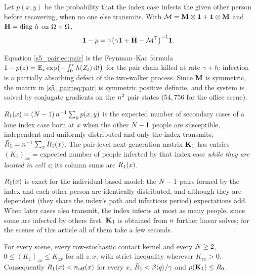 \begin{proposition}\label{s5_pair:prop:pair}
  Let $p(x,y)$ be the probability that the index case infects the given other person before recovering, when
  no one else transmits.  With $\mathcal{M}=\mathbf{M}\otimes\mathbf{1}+\mathbf{1}\otimes\mathbf{M}$ and $\mathbf{H}=\operatorname{diag}\,h$ on
  $\Omega\times\Omega$,
  \begin{equation}\label{s5_pair:eq:pair}
     \boldsymbol{1}-p=\gamma\bigl(\gamma\mathbf{1}+\mathbf{H}-\mathcal{M}^{\mathsf{T}}\bigr)^{-1}\boldsymbol{1} .
  \end{equation}
\end{proposition}

Equation \eqref{s5_pair:eq:pair} is the Feynman--Kac formula
$1-p(z)=\mathbb{E}_z\exp\bigl(-\int_0^{\tau}h(Z_t)\,\mathrm{d} t\bigr)$ for the pair chain killed at rate $\gamma+h$:
infection is a partially absorbing defect of the two-walker process. Since $\mathbf{M}$ is symmetric, the matrix in
\eqref{s5_pair:eq:pair} is symmetric positive definite, and the system is solved by conjugate gradients on the
$n^2$ pair states ($54{,}756$ for the office scene).

\begin{definition}\label{s5_pair:def:R1}
  $R_1(x)=(N-1)\,n^{-1}\sum_{y}p(x,y)$ is the expected number of secondary cases of a lone index case
  born at $x$ when the other $N-1$ people are susceptible, independent and uniformly distributed and only
  the index transmits; $\bar{R}_1=n^{-1}\sum_xR_1(x)$.  The pair-level next-generation matrix
  $\mathbf{K}_1$ has entries $(K_1)_{zx}$ = expected number of people infected by that index case \emph{while they
  are located in cell $z$}; its column sums are $R_1(x)$.
\end{definition}

$R_1(x)$ is exact for the individual-based model: the $N-1$ pairs formed by the index and each other
person are identically distributed, and although they are dependent (they share the index's path and
infectious period) expectations add. When later cases also transmit, the index infects at most as many
people, since some are infected by others first. $\mathbf{K}_1$ is obtained from $n$ further linear solves;
for the scenes of this article all of them take a few seconds.

\begin{proposition}[Saturation]\label{s5_pair:prop:saturation}
  For every scene, every row-stochastic contact kernel and every $N\ge2$,
  $0\le(K_1)_{zx}\le K_{zx}$ for all $z,x$, with strict inequality wherever $K_{zx}>0$.  Consequently
  $R_1(x)<n_{\mathrm{off}}(x)$ for every $x$, $\bar{R}_1<\beta\langle q\rangle/\gamma$ and $\rho(\mathbf{K}_1)\le R_0$.
\end{proposition}

